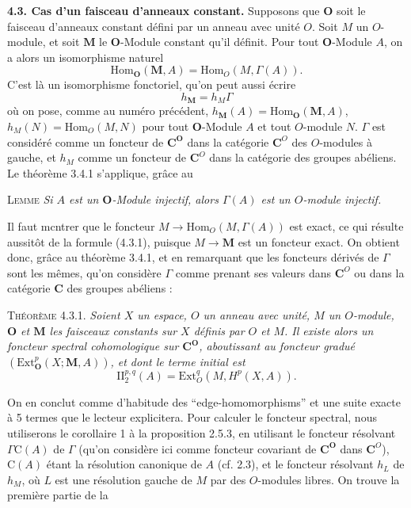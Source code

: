 \clearpage
{}

\textbf{4.3. Cas d'un faisceau d'anneaux constant.}
Supposons que $\mathbf O$ soit le faisceau d'anneaux constant défini par un
anneau avec unité $O$. Soit $M$ un $O$-module, et soit $\mathbf M$ le
$\mathbf O$-Module constant qu'il définit. Pour tout $\mathbf O$-Module $A$,
on a alors un isomorphisme naturel
\[
\tag{4.3.1}
\mathrm{Hom}_{\mathbf O}(\mathbf M,A)=\mathrm{Hom}_O(M,\Gamma(A)).
\]
C'est là un isomorphisme fonctoriel, qu'on peut aussi écrire
\[
\tag{4.3.2}
h_{\mathbf M}=h_M\Gamma
\]
où on pose, comme au numéro précédent,
$h_{\mathbf M}(A)=\mathrm{Hom}_{\mathbf O}(\mathbf M,A)$,
$h_M(N)=\mathrm{Hom}_O(M,N)$ pour tout $\mathbf O$-Module $A$ et tout
$O$-module $N$. $\Gamma$ est considéré comme un foncteur de
$\mathbf C^{\mathbf O}$ dans la catégorie $\mathbf C^O$ des $O$-modules à gauche, et
$h_M$ comme un foncteur de $\mathbf C^O$ dans la catégorie des
groupes abéliens. Le théorème 3.4.1 s'applique, grâce au

\textsc{Lemme} \textit{Si $A$ est un $\mathbf O$-Module injectif,
alors $\Gamma(A)$ est un $O$-module injectif.}

Il faut mcntrer que le foncteur
$M\to\mathrm{Hom}_O(M,\Gamma(A))$ est exact, ce qui résulte aussitôt
de la formule (4.3.1), puisque $M\to\mathbf M$ est un foncteur exact.
On obtient donc, grâce au théorème 3.4.1, et en remarquant que les foncteurs
dérivés de $\Gamma$ sont les mêmes, qu'on considère $\Gamma$ comme prenant
ses valeurs dans $\mathbf C^O$ ou dans la catégorie $\mathbf C$ des groupes abéliens :

\textsc{Théorème 4.3.1.} \textit{Soient $X$ un espace, $O$ un anneau
avec unité, $M$ un $O$-module, $\mathbf O$ et $\mathbf M$ les faisceaux
constants sur $X$ définis par $O$ et $M$. Il existe alors un foncteur spectral
cohomologique sur $\mathbf C^{\mathbf O}$, aboutissant au foncteur gradué
$(\mathrm{Ext}_{\mathbf O}^p(X;\mathbf M,A))$, et dont le terme initial est}
\[
\tag{4.3.3}
\mathrm{II}_2^{p,q}(A)=\mathrm{Ext}_O^q(M,H^p(X,A)).
\]

On en conclut comme d'habitude des ``edge-homomorphisms'' et une suite exacte
à 5 termes que le lecteur explicitera.
Pour calculer le foncteur spectral, nous utiliserons le corollaire 1 à la
proposition 2.5.3, en utilisant le foncteur résolvant $\Gamma \mathrm C(A)$ de
$\Gamma$ (qu'on considère ici comme foncteur covariant de $\mathbf C^{\mathbf O}$
dans $\mathbf C^O$), $\mathrm C(A)$ étant la résolution canonique de $A$ (cf. 2.3), et le
foncteur résolvant $h_L$ de $h_M$, où $L$ est une résolution gauche de $M$ par
des $O$-modules libres. On trouve la première partie de la

